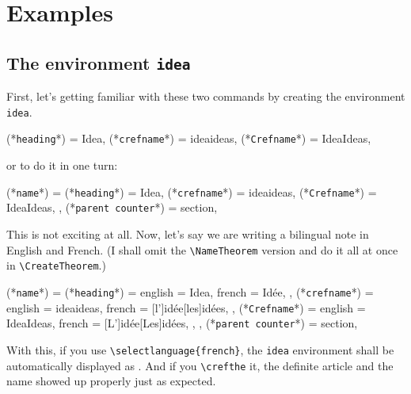 \documentclass[classical]{einfart}
\newcommand{\commandoption}[1]{\texttt{\textcolor{code-keys}{#1}}}
\begin{document}
\section{Examples}

\subsection{The environment {\normalfont\texttt{idea}}}

First, let's getting familiar with these two commands by creating the environment {\normalfont\texttt{idea}}.

\begin{code}
  {
    (*\commandoption{heading}*)  = Idea,
    (*\commandoption{crefname}*) = {idea}{ideas},
    (*\commandoption{Crefname}*) = {Idea}{Ideas},
  }
\CreateTheorem{idea}{ (*\commandoption{parent counter}*) = section }
\end{code}

or to do it in one turn:

\begin{code}
  {
    (*\commandoption{name}*) = {
        (*\commandoption{heading}*)  = Idea,
        (*\commandoption{crefname}*) = {idea}{ideas},
        (*\commandoption{Crefname}*) = {Idea}{Ideas},
      },
    (*\commandoption{parent counter}*) = section,
  }
\end{code}

\smallskip
This is not exciting at all. Now, let's say we are writing a bilingual note in English and French. (I shall omit the \lstinline|\NameTheorem| version and do it all at once in \lstinline|\CreateTheorem|.)

\begin{code}
  {
    (*\commandoption{name}*) = {
        (*\commandoption{heading}*)  = { english = Idea,
                       french = Idée, },
        (*\commandoption{crefname}*) = { english = {idea}{ideas},
                       french = [l']{idée}[les]{idées}, },
        (*\commandoption{Crefname}*) = { english = {Idea}{Ideas},
                       french = [L']{idée}[Les]{idées}, },
      },
    (*\commandoption{parent counter}*) = section,
  }
\end{code}

With this, if you use \lstinline|\selectlanguage{french}|, the {\normalfont\texttt{idea}} environment shall be automatically displayed as . And if you \lstinline|\crefthe| it, the definite article and the name showed up properly just as expected.
\end{document}
